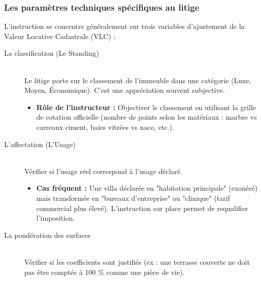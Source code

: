 \documentclass[Cours_contentieuxTF2026.tex]{subfiles}
\begin{document}
\subsubsection{Les paramètres techniques spécifiques au litige}

L'instruction se concentre généralement sur trois variables d'ajustement de la Valeur Locative Cadastrale (VLC) :

\begin{description}
	\item[La classification (Le Standing)] \hfill \\
	Le litige porte sur le classement de l'immeuble dans une catégorie (Luxe, Moyen, Économique). C'est une appréciation souvent subjective.
	
	\begin{itemize}[label=\tiny$\blacksquare$]
		\item  \textbf{Rôle de l'instructeur :} Objectiver le classement en utilisant la grille de cotation officielle (nombre de points selon les matériaux : marbre vs carreaux ciment, baies vitrées vs naco, etc.).
	\end{itemize}
	
	\item[L'affectation (L'Usage)] \hfill \\
       Vérifier si l'usage réel correspond à l'usage déclaré.
       
       	\begin{itemize}[label=\tiny$\blacksquare$]
       	\item \textbf{ Cas fréquent :} Une villa déclarée en "habitation principale" (exonéré) mais transformée en "bureaux d'entreprise" ou "clinique" (tarif commercial plus élevé). L'instruction sur place permet de requalifier l'imposition.
       \end{itemize}
	
	\item[La pondération des surfaces] \hfill \\
	Vérifier si les coefficients sont justifiés (ex : une terrasse couverte ne doit pas être comptée à 100 \% comme une pièce de vie).
\end{description}

\begin{center}
\end{center}
\end{document}
